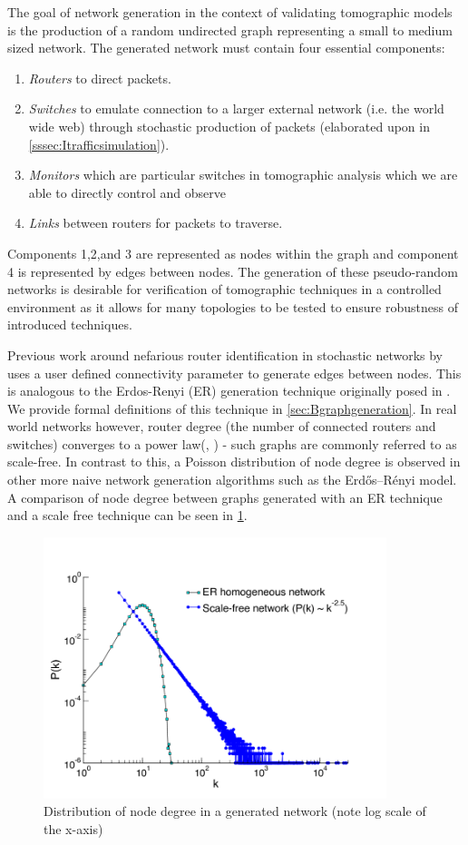 The goal of network generation in the context of validating tomographic models is the production of a random undirected graph representing a small to medium sized network. The generated network must contain four essential components: 
\begin{enumerate}
    \item \textit{Routers} to direct packets.
    \item \textit{Switches} to emulate connection to a larger external network (i.e. the world wide web) through stochastic production of packets (elaborated upon in \cref{sssec:Itrafficsimulation}).
    \item \textit{Monitors} which are particular switches in tomographic analysis which we are able to directly control and observe
    \item \textit{Links} between routers for packets to traverse.
\end{enumerate}
Components 1,2,and 3 are represented as nodes within the graph and component 4 is represented by edges between nodes. The generation of these pseudo-random networks is desirable for verification of tomographic techniques in a controlled environment as it allows for many topologies to be tested to ensure robustness of introduced techniques.\par
Previous work around nefarious router identification in stochastic networks by \cite{barnes_stochastic_2020} uses a user defined connectivity parameter to generate edges between nodes. This is analogous to the Erdos-Renyi (ER) generation technique originally posed in \cite{erdos_random_1959}. We provide formal definitions of this technique in \cref{sec:Bgraphgeneration}. In real world networks however, router degree (the number of connected routers and switches) converges to a power law(\cite{chen_origin_2002}, \cite{zhao_measurement_2020}) - such graphs are commonly referred to as scale-free. In contrast to this, a Poisson distribution of node degree is observed in other more naive network generation algorithms such as the Erdős–Rényi model. A comparison of node degree between graphs generated with an ER technique and a scale free technique can be seen in \ref{fig:nddist}.\par
\begin{figure}[t]
    \centering
    \includegraphics[width=10cm]{figs/intro/nodedegree-dist.png}
    \caption[Distribution of node degree in a generated network]{Distribution of node degree in a generated network (note log scale of the x-axis) \cite{baronchelli_networks_2013}}
    \label{fig:nddist}
\end{figure}

